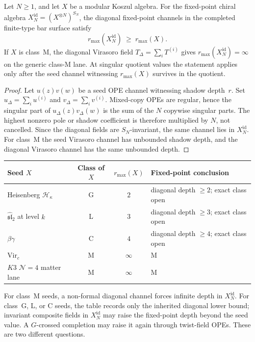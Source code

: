 \begin{proposition}\label{prop:symn-shadow-depth}
Let $N\geq1$, and let $X$ be a modular Koszul algebra. For the
fixed-point chiral algebra
$X_N^{\mathrm{id}}=(X^{\otimes N})^{S_N}$, the diagonal fixed-point
channels in the completed finite-type bar surface satisfy
\begin{equation}\label{eq:symn-shadow-depth-bound}
 r_{\max}(X_N^{\mathrm{id}})
 \;\geq\; r_{\max}(X).
\end{equation}
If $X$ is class~M, the diagonal Virasoro field
$T_\Delta=\sum_iT^{(i)}$ gives
$r_{\max}(X_N^{\mathrm{id}})=\infty$ on the generic class-M lane.
At singular quotient values the statement applies only after the
seed channel witnessing $r_{\max}(X)$ survives in the quotient.
\end{proposition}

\begin{proof}
Let $u(z)v(w)$ be a seed OPE channel witnessing shadow depth~$r$.
Set $u_\Delta=\sum_i u^{(i)}$ and
$v_\Delta=\sum_i v^{(i)}$. Mixed-copy OPEs are regular, hence the
singular part of $u_\Delta(z)v_\Delta(w)$ is the sum of the $N$
copywise singular parts. The highest nonzero pole or shadow
coefficient is therefore multiplied by $N$, not cancelled. Since
the diagonal fields are $S_N$-invariant, the same channel lies in
$X_N^{\mathrm{id}}$. For class~M the seed Virasoro channel has
unbounded shadow depth, and the diagonal Virasoro channel has the
same unbounded depth.
\end{proof}

\begin{remark}
\label{rem:symn-shadow-class-examples}
\begin{center}
\renewcommand{\arraystretch}{1.3}
\begin{tabular}{lccl}
\toprule
Seed $X$ & Class of $X$ & $r_{\max}(X)$ &
 Fixed-point conclusion \\
\midrule
Heisenberg $\mathcal{H}_\kappa$ & G & $2$ &
 diagonal depth $\geq2$; exact class open \\
$\widehat{\mathfrak{sl}}_2$ at level $k$ & L & $3$ &
 diagonal depth $\geq3$; exact class open \\
$\beta\gamma$ & C & $4$ &
 diagonal depth $\geq4$; exact class open \\
$\mathrm{Vir}_c$ & M & $\infty$ & M \\
$K3$ $\mathcal N=4$ matter lane & M & $\infty$ & M \\
\bottomrule
\end{tabular}
\end{center}
For class~M seeds, a non-formal diagonal channel forces infinite
depth in $X_N^{\mathrm{id}}$. For class~G, L, or C seeds, the table
records only the inherited diagonal lower bound; invariant composite
fields in $X_N^{\mathrm{id}}$ may raise the fixed-point depth beyond
the seed value. A $G$-crossed completion may raise it again through
twist-field OPEs. These are two different questions.
\end{remark}


